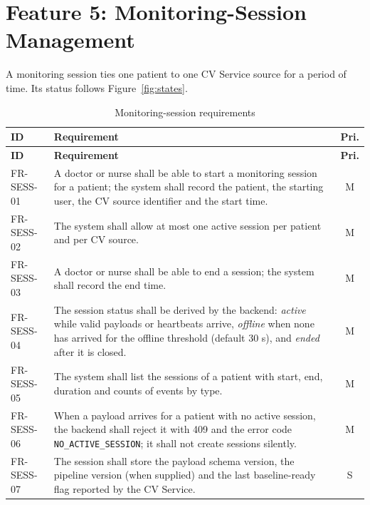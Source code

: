 \documentclass[a4paper,11pt]{scrreprt}
\makeatletter
\newenvironment{reqtable}[1]{%
  \small
  \begin{longtable}{@{}>{\ttfamily\footnotesize}p{2.55cm}>{\raggedright\arraybackslash}p{10.7cm}c@{}}
  \caption{#1}\\
  \toprule \textbf{ID} & \textbf{Requirement} & \textbf{Pri.}\\ \midrule
  \endfirsthead
  \toprule \textbf{ID} & \textbf{Requirement} & \textbf{Pri.}\\ \midrule
  \endhead
  \bottomrule
  \endfoot
}{%
  \end{longtable}\normalsize
}
\newcommand{\req}[3]{#1 & #2 & #3 \\ \midrule}
\newcommand{\code}[1]{\texttt{#1}}
\makeatother
\begin{document}
\section{Feature 5: Monitoring-Session Management}
A monitoring session ties one patient to one CV Service source for a period of time. Its status follows Figure~\ref{fig:states}.
\begin{reqtable}{Monitoring-session requirements}
\req{FR-SESS-01}{A doctor or nurse shall be able to start a monitoring session for a patient; the system shall record the patient, the starting user, the CV source identifier and the start time.}{M}
\req{FR-SESS-02}{The system shall allow at most one active session per patient and per CV source.}{M}
\req{FR-SESS-03}{A doctor or nurse shall be able to end a session; the system shall record the end time.}{M}
\req{FR-SESS-04}{The session status shall be derived by the backend: \emph{active} while valid payloads or heartbeats arrive, \emph{offline} when none has arrived for the offline threshold (default 30 s), and \emph{ended} after it is closed.}{M}
\req{FR-SESS-05}{The system shall list the sessions of a patient with start, end, duration and counts of events by type.}{M}
\req{FR-SESS-06}{When a payload arrives for a patient with no active session, the backend shall reject it with 409 and the error code \code{NO_ACTIVE_SESSION}; it shall not create sessions silently.}{M}
\req{FR-SESS-07}{The session shall store the payload schema version, the pipeline version (when supplied) and the last baseline-ready flag reported by the CV Service.}{S}
\end{reqtable}
\end{document}
